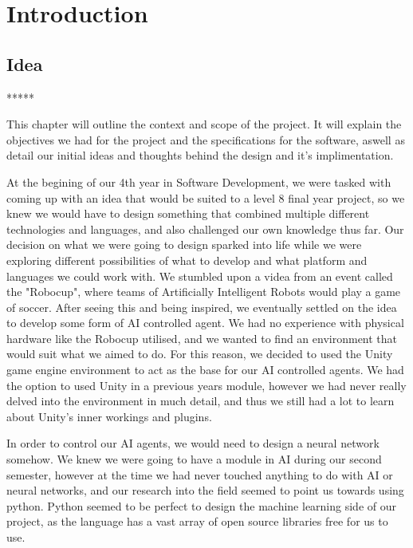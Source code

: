 
\chapter{Introduction}


\section{Idea}

*****

This chapter will outline the context and scope of the project. It will explain the objectives we had for the project and the specifications for the software, aswell as detail our initial ideas and thoughts behind the design and it's implimentation.

At the begining of our 4th year in Software Development, we were tasked with coming up with an idea that would be suited to a level 8 final year project, so we knew we would have to design something that combined multiple different technologies and languages, and also challenged our own knowledge thus far. Our decision on what we were going to design sparked into life while we were exploring different possibilities of what to develop and what platform and languages we could work with. We stumbled upon a videa from an event called the "Robocup", where teams of Artificially Intelligent Robots would play a game of soccer. After seeing this and being inspired, we eventually settled on the idea to develop some form of AI controlled agent. We had no experience with physical hardware like the Robocup utilised, and we wanted to find an environment that would suit what we aimed to do. For this reason, we decided to used the Unity game engine environment to act as the base for our AI controlled agents. We had the option to used Unity in a previous years module, however we had never really delved into the environment in much detail, and thus we still had a lot to learn about Unity's inner workings and plugins.

In order to control our AI agents, we would need to design a neural network somehow. We knew we were going to have a module in AI during our second semester, however at the time we had never touched anything to do with AI or neural networks, and our research into the field seemed to point us towards using python. Python seemed to be perfect to design the machine learning side of our project, as the language has a vast array of open source libraries free for us to use.

